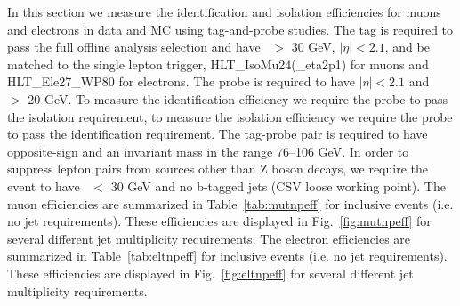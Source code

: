 In this section we measure the identification and isolation efficiencies for muons and electrons in data and MC using tag-and-probe studies. 
The tag is required to pass the full offline analysis selection and have \pt\ $>$ 30 GeV, $|\eta|<2.1$, and be matched to the single
lepton trigger, HLT\_IsoMu24(\_eta2p1) for muons and HLT\_Ele27\_WP80 for electrons. 
The probe is required to have $|\eta|<2.1$ and \pt\ $>$ 20 GeV. To measure the identification efficiency we require the probe to pass the isolation requirement,
to measure the isolation efficiency we require the probe to pass the identification requirement.
The tag-probe pair is required to have opposite-sign and an invariant mass in the range 76--106 GeV.
In order to suppress lepton pairs from sources other than Z boson decays, we require the event to have \met\ $<$ 30 GeV and no b-tagged jets (CSV loose working point).
The muon efficiencies are summarized in Table~\ref{tab:mutnpeff} for inclusive events (i.e. no jet requirements). These efficiencies are displayed in Fig.~\ref{fig:mutnpeff} for
several different jet multiplicity requirements.
The electron efficiencies are summarized in Table~\ref{tab:eltnpeff} for inclusive events (i.e. no jet requirements). These efficiencies are displayed in Fig.~\ref{fig:eltnpeff} for
several different jet multiplicity requirements.




